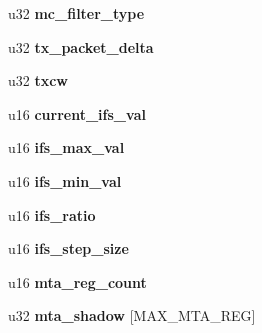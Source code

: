 \begin{DoxyCompactItemize}
\item 
\hypertarget{structe1000__mac__info_aa5eb8e3d908ce8666939e29f7c73982a}{
u32 {\bfseries mc\_\-filter\_\-type}}
\label{structe1000__mac__info_aa5eb8e3d908ce8666939e29f7c73982a}

\item 
\hypertarget{structe1000__mac__info_a4f00bd0be4c79792c75bc8fe92f3a125}{
u32 {\bfseries tx\_\-packet\_\-delta}}
\label{structe1000__mac__info_a4f00bd0be4c79792c75bc8fe92f3a125}

\item 
\hypertarget{structe1000__mac__info_adcd17c1c325d4f4db02181ec423c9945}{
u32 {\bfseries txcw}}
\label{structe1000__mac__info_adcd17c1c325d4f4db02181ec423c9945}

\item 
\hypertarget{structe1000__mac__info_aff409600a0d010e8a8e3f918a6538d6e}{
u16 {\bfseries current\_\-ifs\_\-val}}
\label{structe1000__mac__info_aff409600a0d010e8a8e3f918a6538d6e}

\item 
\hypertarget{structe1000__mac__info_a9bf78951b6904ec3cf56a2958665ae74}{
u16 {\bfseries ifs\_\-max\_\-val}}
\label{structe1000__mac__info_a9bf78951b6904ec3cf56a2958665ae74}

\item 
\hypertarget{structe1000__mac__info_a0b4e5050ee3e257f41aad2f53f3b3622}{
u16 {\bfseries ifs\_\-min\_\-val}}
\label{structe1000__mac__info_a0b4e5050ee3e257f41aad2f53f3b3622}

\item 
\hypertarget{structe1000__mac__info_ad3cec434d29597c9307520776c6ba5d7}{
u16 {\bfseries ifs\_\-ratio}}
\label{structe1000__mac__info_ad3cec434d29597c9307520776c6ba5d7}

\item 
\hypertarget{structe1000__mac__info_a72318a33c0eb787ac45548fdb469b833}{
u16 {\bfseries ifs\_\-step\_\-size}}
\label{structe1000__mac__info_a72318a33c0eb787ac45548fdb469b833}

\item 
\hypertarget{structe1000__mac__info_aaeb73d6a1af630e29c2e3b6382e8568a}{
u16 {\bfseries mta\_\-reg\_\-count}}
\label{structe1000__mac__info_aaeb73d6a1af630e29c2e3b6382e8568a}

\item 
\hypertarget{structe1000__mac__info_ace12c38e0cb4f889a256216a3df855d2}{
u32 {\bfseries mta\_\-shadow} \mbox{[}MAX\_\-MTA\_\-REG\mbox{]}}
\label{structe1000__mac__info_ace12c38e0cb4f889a256216a3df855d2}


\end{DoxyCompactItemize}
